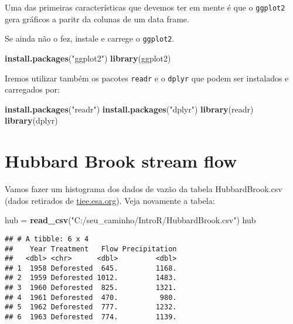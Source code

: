 \documentclass[
]{book}
\newenvironment{Shaded}{\begin{snugshade}}{\end{snugshade}}
\newcommand{\KeywordTok}[1]{\textcolor[rgb]{0.13,0.29,0.53}{\textbf{#1}}}
\newcommand{\NormalTok}[1]{#1}
\newcommand{\StringTok}[1]{\textcolor[rgb]{0.31,0.60,0.02}{#1}}
\begin{document}
Uma das primeiras características que devemos ter em mente é que o \texttt{ggplot2} gera gráficos a paritr da colunas de um data frame.

Se ainda não o fez, instale e carrege o \texttt{ggplot2}.

\begin{Shaded}
\begin{Highlighting}[]
\KeywordTok{install.packages}\NormalTok{(}\StringTok{"ggplot2"}\NormalTok{)}
\KeywordTok{library}\NormalTok{(ggplot2)}
\end{Highlighting}
\end{Shaded}

Iremos utilizar também os pacotes \texttt{readr} e o \texttt{dplyr} que podem ser instalados e carregados por:

\begin{Shaded}
\begin{Highlighting}[]
\KeywordTok{install.packages}\NormalTok{(}\StringTok{"readr"}\NormalTok{)}
\KeywordTok{install.packages}\NormalTok{(}\StringTok{"dplyr"}\NormalTok{)}
\KeywordTok{library}\NormalTok{(readr)}
\KeywordTok{library}\NormalTok{(dplyr)}
\end{Highlighting}
\end{Shaded}

\hypertarget{hubbard-brook-stream-flow}{%
\section{Hubbard Brook stream flow}\label{hubbard-brook-stream-flow}}

Vamos fazer um histograma dos dados de vazão da tabela HubbardBrook.csv (dados retirados de \href{https://tiee.esa.org/vol/v1/data_sets/hubbard/hubbard_overview.html}{tiee.esa.org}). Veja novamente a tabela:

\begin{Shaded}
\begin{Highlighting}[]
\NormalTok{hub =}\StringTok{ }\KeywordTok{read_csv}\NormalTok{(}\StringTok{"C:/seu_caminho/IntroR/HubbardBrook.csv"}\NormalTok{)}
\NormalTok{hub}
\end{Highlighting}
\end{Shaded}

\begin{verbatim}
## # A tibble: 6 x 4
##    Year Treatment   Flow Precipitation
##   <dbl> <chr>      <dbl>         <dbl>
## 1  1958 Deforested  645.         1168.
## 2  1959 Deforested 1012.         1483.
## 3  1960 Deforested  825.         1321.
## 4  1961 Deforested  470.          980.
## 5  1962 Deforested  777.         1232.
## 6  1963 Deforested  774.         1139.
\end{verbatim}
\end{document}
